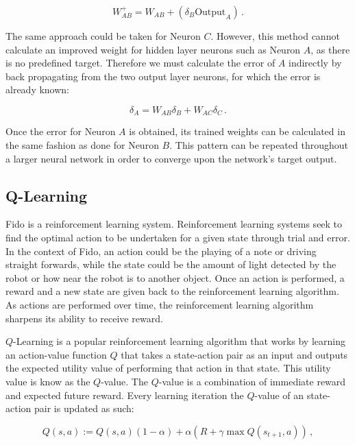 \begin{equation}
	W_{AB}^{+} = W_{AB} + (\delta_B \text{Output}_A)\,.
\end{equation}

The same approach could be taken for Neuron $C$.
However, this method cannot calculate an improved weight for hidden layer neurons such as Neuron $A$, as there is no predefined target.
Therefore we must calculate the error of $A$ indirectly by back propagating from the two output layer neurons, for which the error is already known:

\begin{equation}
	\delta_A = W_{AB}\delta_B + W_{AC}\delta_C \,.
\end{equation}

Once the error for Neuron $A$ is obtained, its trained weights can be calculated in the same fashion as done for Neuron $B$.
This pattern can be repeated throughout a larger neural network in order to converge upon the network's target output.

\subsection{Q-Learning}

Fido is a reinforcement learning system. Reinforcement learning systems seek to find the optimal action to be undertaken for a given state through trial and error.
In the context of Fido, an action could be the playing of a note or driving straight forwards, while the state could be the amount of light detected by the robot or how near the robot is to another object.
Once an action is performed, a reward and a new state are given back to the reinforcement learning algorithm.
As actions are performed over time, the reinforcement learning algorithm sharpens its ability to receive reward.

$Q$-Learning \cite{watkins} is a popular reinforcement learning algorithm that works by learning an action-value function $Q$ that takes a state-action pair as an input and outputs the expected utility value of performing that action in that state.
This utility value is know as the $Q$-value.
The $Q$-value is a combination of immediate reward and expected future reward.
Every learning iteration the $Q$-value of an state-action pair is updated as such:

\begin{equation}
	Q(s, a) := Q(s, a)(1 - \alpha) + \alpha(R + \gamma \max Q(s_{t+1}, a))
	\,,
	\label{equ::updateqlearn}
\end{equation}

